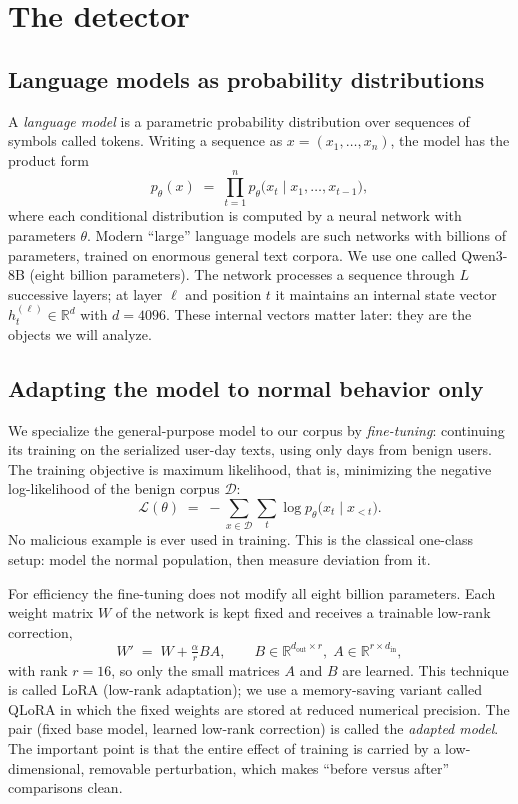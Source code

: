 \documentclass[10pt]{article}
\begin{document}
\section{The detector}

\subsection{Language models as probability distributions}

A \emph{language model} is a parametric probability distribution over
sequences of symbols called tokens. Writing a sequence as
$x = (x_1, \dots, x_n)$, the model has the product form
\begin{equation}
p_\theta(x) \;=\; \prod_{t=1}^{n} p_\theta\bigl(x_t \mid x_1, \dots,
x_{t-1}\bigr),
\end{equation}
where each conditional distribution is computed by a neural network with
parameters $\theta$. Modern ``large'' language models are such networks
with billions of parameters, trained on enormous general text corpora.
We use one called Qwen3-8B (eight billion parameters). The network
processes a sequence through $L$ successive layers; at layer $\ell$ and
position $t$ it maintains an internal state vector
$h^{(\ell)}_t \in \mathbb{R}^{d}$ with $d = 4096$. These internal
vectors matter later: they are the objects we will analyze.

\subsection{Adapting the model to normal behavior only}

We specialize the general-purpose model to our corpus by
\emph{fine-tuning}: continuing its training on the serialized user-day
texts, using only days from benign users. The training objective is
maximum likelihood, that is, minimizing the negative log-likelihood of
the benign corpus $\mathcal{D}$:
\begin{equation}
\mathcal{L}(\theta) \;=\; -\sum_{x \in \mathcal{D}} \sum_{t}
\log p_\theta\bigl(x_t \mid x_{<t}\bigr).
\end{equation}
No malicious example is ever used in training. This is the classical
one-class setup: model the normal population, then measure deviation
from it.

For efficiency the fine-tuning does not modify all eight billion
parameters. Each weight matrix $W$ of the network is kept fixed and
receives a trainable low-rank correction,
\begin{equation}
W' \;=\; W + \tfrac{\alpha}{r} BA, \qquad B \in \mathbb{R}^{d_{\mathrm{out}}
\times r},\; A \in \mathbb{R}^{r \times d_{\mathrm{in}}},
\end{equation}
with rank $r = 16$, so only the small matrices $A$ and $B$ are learned.
This technique is called LoRA (low-rank adaptation); we use a
memory-saving variant called QLoRA in which the fixed weights are stored
at reduced numerical precision. The pair (fixed base model, learned
low-rank correction) is called the \emph{adapted model}. The important
point is that the entire effect of training is carried by a
low-dimensional, removable perturbation, which makes ``before versus
after'' comparisons clean.
\end{document}
